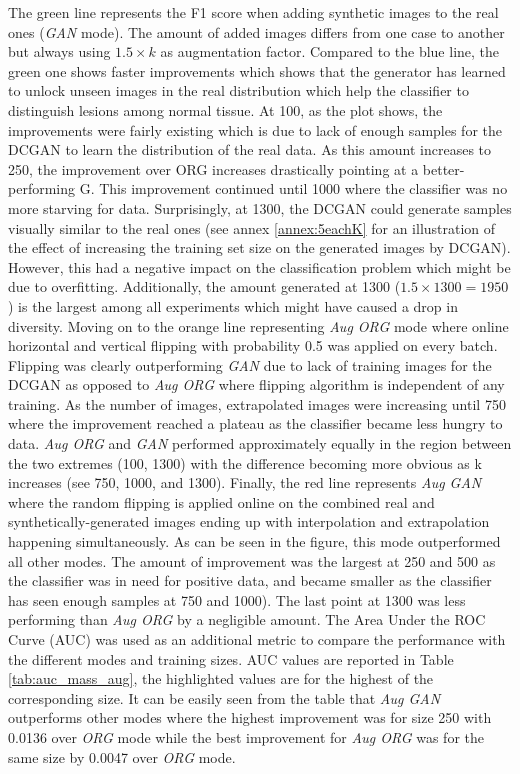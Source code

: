 \documentclass[final,3p,twocolumn,authoryear,sort&compress,times]{maia}
\begin{document}
The green line represents the F1 score when adding synthetic images to the real ones (\textit{GAN} mode). The amount of added images differs from one case to another but always using $1.5 \times k$ as augmentation factor. Compared to the blue line, the green one shows faster improvements which shows that the generator has learned to unlock unseen images in the real distribution which help the classifier to distinguish lesions among normal tissue. At 100, as the plot shows, the improvements were fairly existing which is due to lack of enough samples for the DCGAN to learn the distribution of the real data. As this amount increases to 250, the improvement over ORG increases drastically pointing at a better-performing G. This improvement continued until 1000 where the classifier was no more starving for data. Surprisingly, at 1300, the DCGAN could generate samples visually similar to the real ones (see annex \ref{annex:5eachK} for an illustration of the effect of increasing the training set size on the generated images by DCGAN). However, this had a negative impact on the classification problem which might be due to overfitting. Additionally, the amount generated at 1300 ($1.5 \times 1300= 1950$) is the largest among all experiments which might have caused a drop in diversity. Moving on to the orange line representing \textit{Aug ORG} mode where online horizontal and vertical flipping with probability 0.5 was applied on every batch. Flipping was clearly outperforming \textit{GAN} due to lack of training images for the DCGAN as opposed to \textit{Aug ORG} where flipping algorithm is independent of any training. As the number of images, extrapolated images were increasing until 750 where the improvement reached a plateau as the classifier became less hungry to data. \textit{Aug ORG} and \textit{GAN} performed approximately equally in the region between the two extremes (100, 1300) with the difference becoming more obvious as k increases (see 750, 1000, and 1300). Finally, the red line represents \textit{Aug GAN} where the random flipping is applied online on the combined real and synthetically-generated images ending up with interpolation and extrapolation happening simultaneously. As can be seen in the figure, this mode outperformed all other modes. The amount of improvement was the largest at 250 and 500 as the classifier was in need for positive data, and became smaller as the classifier has seen enough samples at 750 and 1000). The last point at 1300 was less performing than \textit{Aug ORG} by a negligible amount. The Area Under the ROC Curve (AUC) was used as an additional metric to compare the performance with the different modes and training sizes. AUC values are reported in Table \ref{tab:auc_mass_aug}, the highlighted values are for the highest of the corresponding size. It can be easily seen from the table that \textit{Aug GAN} outperforms other modes where the highest improvement was for size 250 with 0.0136 over \textit{ORG} mode while the best improvement for \textit{Aug ORG} was for the same size by 0.0047 over \textit{ORG} mode.
\end{document}
